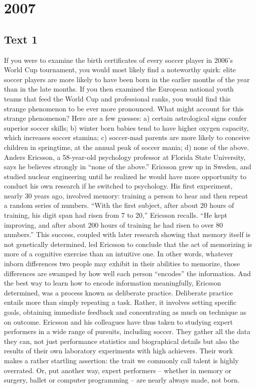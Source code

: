    
\section{2007}
\subsection{Text 1}
If you were to examine the birth certificates of every soccer player in 2006’s World Cup tournament, you would most likely find a noteworthy quirk: elite soccer players are more likely to have been born in the earlier months of the year than in the late months. If you then examined the European national youth teams that feed the World Cup and professional ranks, you would find this strange phenomenon to be ever more pronounced.
What might account for this strange phenomenon? Here are a few guesses: a) certain astrological signs confer superior soccer skills; b) winter born babies tend to have higher oxygen capacity, which increases soccer stamina; c) soccer-mad parents are more likely to conceive children in springtime, at the annual peak of soccer mania; d) none of the above.
Anders Ericsson, a 58-year-old psychology professor at Florida State University, says he believes strongly in “none of the above.” Ericsson grew up in Sweden, and studied nuclear engineering until he realized he would have more opportunity to conduct his own research if he switched to psychology. His first experiment, nearly 30 years ago, involved memory: training a person to hear and then repeat a random series of numbers. “With the first subject, after about 20 hours of training, his digit span had risen from 7 to 20,” Ericsson recalls. “He kept improving, and after about 200 hours of training he had risen to over 80 numbers.”
This success, coupled with later research showing that memory itself is not genetically determined, led Ericsson to conclude that the act of memorizing is more of a cognitive exercise than an intuitive one. In other words, whatever inborn differences two people may exhibit in their abilities to memorize, those differences are swamped by how well each person “encodes” the information. And the best way to learn how to encode information meaningfully, Ericsson determined, was a process known as deliberate practice. Deliberate practice entails more than simply repeating a task. Rather, it involves setting specific goals, obtaining immediate feedback and concentrating as much on technique as on outcome.
Ericsson and his colleagues have thus taken to studying expert performers in a wide range of pursuits, including soccer. They gather all the data they can, not just performance statistics and biographical details but also the results of their own laboratory experiments with high achievers. Their work makes a rather startling assertion: the trait we commonly call talent is highly overrated. Or, put another way, expert performers – whether in memory or surgery, ballet or computer programming – are nearly always made, not born.
